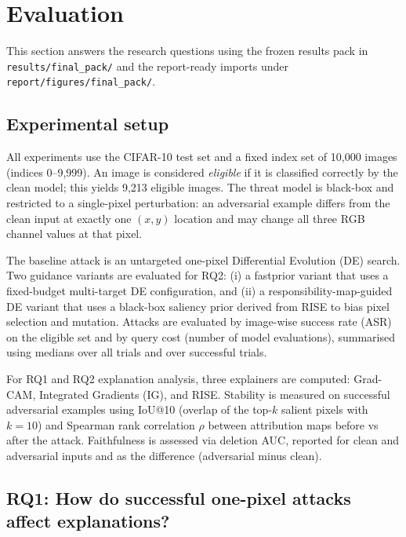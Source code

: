 \section{Evaluation}
\label{sec:evaluation}

This section answers the research questions using the frozen results pack in \texttt{results/final\_pack/} and the report-ready imports under \texttt{report/figures/final\_pack/}.

\subsection{Experimental setup}
All experiments use the CIFAR-10 test set and a fixed index set of 10{,}000 images (indices 0--9{,}999). An image is considered \emph{eligible} if it is classified correctly by the clean model; this yields 9{,}213 eligible images. The threat model is black-box and restricted to a single-pixel perturbation: an adversarial example differs from the clean input at exactly one $(x,y)$ location and may change all three RGB channel values at that pixel.

The baseline attack is an untargeted one-pixel Differential Evolution (DE) search. Two guidance variants are evaluated for RQ2: (i) a fastprior variant that uses a fixed-budget multi-target DE configuration, and (ii) a responsibility-map-guided DE variant that uses a black-box saliency prior derived from RISE to bias pixel selection and mutation. Attacks are evaluated by image-wise success rate (ASR) on the eligible set and by query cost (number of model evaluations), summarised using medians over all trials and over successful trials.

For RQ1 and RQ2 explanation analysis, three explainers are computed: Grad-CAM, Integrated Gradients (IG), and RISE. Stability is measured on successful adversarial examples using IoU@10 (overlap of the top-$k$ salient pixels with $k=10$) and Spearman rank correlation $\rho$ between attribution maps before vs after the attack. Faithfulness is assessed via deletion AUC, reported for clean and adversarial inputs and as the difference (adversarial minus clean).

\subsection{RQ1: How do successful one-pixel attacks affect explanations?}

